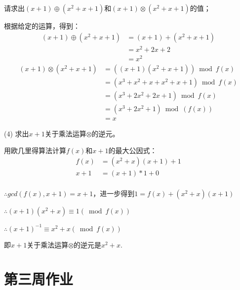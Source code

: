 请求出$(x+1)\oplus(x^2+x+1)$和$(x+1)\otimes(x^2+x+1)$的值；

\begin{Solution}
    根据给定的运算，得到：
    \begin{equation}
        \begin{aligned}
            (x+1)\oplus(x^2+x+1)    &= (x+1)+(x^2+x+1)\\
                                    &= x^2 + 2x + 2\\
                                    &= x^2
        \end{aligned}
    \end{equation}
    \begin{equation}
        \begin{aligned}
        (x+1)\otimes(x^2+x+1)   &= ((x+1)(x^2+x+1)) \bmod f(x)\\
                                &= (x^3+x^2+x+x^2+x+1) \bmod f(x)\\
                                &= (x^3+2x^2+2x+1) \bmod f(x)\\
                                &= (x^3 +2x^2+ 1) \bmod (f(x))\\
                                &= x
        \end{aligned}
    \end{equation}
\end{Solution}

(4) 求出$x+1$关于乘法运算$\otimes$的逆元。

\begin{Solution}
    用欧几里得算法计算$f(x)$和$x+1$的最大公因式：
    \begin{equation}
        \begin{aligned}
            f(x) &= (x^2 + x)(x+1) + 1\\
            x+1 &= (x+1) * 1 + 0\\
        \end{aligned}
    \end{equation}

    $\therefore gcd(f(x), x+1) = x+1$，进一步得到$1=f(x)+(x^2+x)(x+1)$

    $\therefore (x+1)(x^2+x) \equiv 1 (\bmod f(x))$

    $\therefore (x+1)^{-1} \equiv x^2+x (\bmod f(x))$

    即$x+1$关于乘法运算$\otimes$的逆元是$x^2+x$.
\end{Solution}

\newpage
\chapter{第三周作业}

